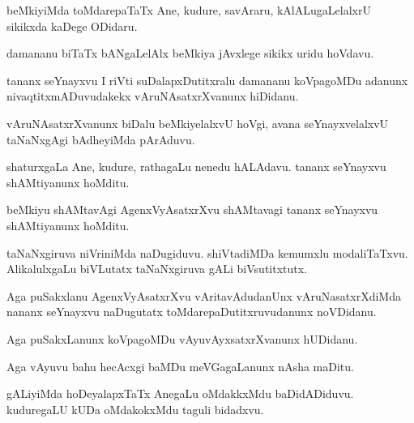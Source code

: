 \documentclass{article}
\begin{document}
\begin{mn}%
beMkiyiMda toMdarepaTaTx Ane, kudure, savAraru, kAlALugaLelalxrU sikikxda kaDege ODidaru.
\end{mn}

\begin{mn}%
damananu biTaTx bANgaLelAlx beMkiya jAvxlege sikikx uridu hoVdavu.
\end{mn}

\begin{mn}%
tananx seYnayxvu I riVti suDalapxDutitxralu damananu koVpagoMDu adanunx 
nivaqtitxmADuvudakekx vAruNAsatxrXvanunx hiDidanu.
\end{mn}

\begin{mn}%
vAruNAsatxrXvanunx biDalu beMkiyelalxvU hoVgi, avana seYnayxvelalxvU taNaNxgAgi bAdheyiMda 
pArAduvu.
\end{mn}

\begin{mn}%
shaturxgaLa Ane, kudure, rathagaLu nenedu hALAdavu. tananx seYnayxvu shAMtiyanunx hoMditu.
\end{mn}

\begin{mn}%
beMkiyu shAMtavAgi AgenxVyAsatxrXvu shAMtavagi tananx seYnayxvu shAMtiyanunx hoMditu.
\end{mn}

\begin{mn}%
taNaNxgiruva niVriniMda naDugiduvu. shiVtadiMDa kemumxlu modaliTaTxvu. AlikalulxgaLu 
biVLutatx taNaNxgiruva gALi biVsutitxtutx.
\end{mn}

\begin{mn}%
Aga puSakxlanu AgenxVyAsatxrXvu vAritavAdudanUnx vAruNasatxrXdiMda nananx seYnayxvu 
naDugutatx toMdarepaDutitxruvudanunx noVDidanu.
\end{mn}

\begin{mn}%
Aga puSakxLanunx koVpagoMDu vAyuvAyxsatxrXvanunx hUDidanu. 
\end{mn}

\begin{mn}%
Aga vAyuvu bahu hecAcxgi baMDu meVGagaLanunx nAsha maDitu.
\end{mn}

\begin{mn}%
gALiyiMda hoDeyalapxTaTx AnegaLu oMdakkxMdu baDidADiduvu. kuduregaLU kUDa oMdakokxMdu taguli
bidadxvu.
\end{mn}
\end{document}
